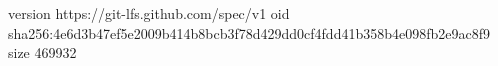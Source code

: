 version https://git-lfs.github.com/spec/v1
oid sha256:4e6d3b47ef5e2009b414b8bcb3f78d429dd0cf4fdd41b358b4e098fb2e9ac8f9
size 469932
